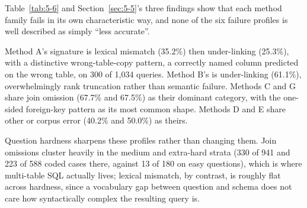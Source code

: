 Table~\ref{tab:5-6} and Section~\ref{sec:5-5}'s three findings show that each method family fails in its own characteristic way, and none of the six failure profiles is well described as simply ``less accurate''.

Method A's signature is lexical mismatch (35.2\%) then under-linking (25.3\%), with a distinctive wrong-table-copy pattern, a correctly named column predicted on the wrong table, on 300 of 1,034 queries. Method B's is under-linking (61.1\%), overwhelmingly rank truncation rather than semantic failure. Methods C and G share join omission (67.7\% and 67.5\%) as their dominant category, with the one-sided foreign-key pattern as its most common shape. Methods D and E share other or corpus error (40.2\% and 50.0\%) as theirs.

Question hardness sharpens these profiles rather than changing them. Join omissions cluster heavily in the medium and extra-hard strata (330 of 941 and 223 of 588 coded cases there, against 13 of 180 on easy questions), which is where multi-table SQL actually lives; lexical mismatch, by contrast, is roughly flat across hardness, since a vocabulary gap between question and schema does not care how syntactically complex the resulting query is.
